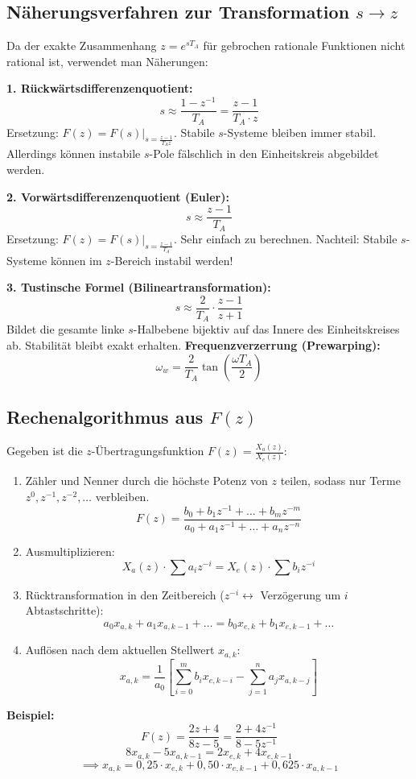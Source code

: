 \subsection{Näherungsverfahren zur Transformation $s \to z$}
\begin{tcolorbox}
Da der exakte Zusammenhang $z = e^{s T_A}$ für gebrochen rationale Funktionen nicht rational ist, verwendet man Näherungen:

\textbf{1. Rückwärtsdifferenzenquotient:}
\[
s \approx \frac{1 - z^{-1}}{T_A} = \frac{z - 1}{T_A \cdot z}
\]
Ersetzung: $F(z) = F(s)\big|_{s = \frac{z-1}{T_A z}}$.
Stabile $s$-Systeme bleiben immer stabil. Allerdings können instabile $s$-Pole fälschlich in den Einheitskreis abgebildet werden.

\textbf{2. Vorwärtsdifferenzenquotient (Euler):}
\[
s \approx \frac{z - 1}{T_A}
\]
Ersetzung: $F(z) = F(s)\big|_{s = \frac{z-1}{T_A}}$.
Sehr einfach zu berechnen. Nachteil: Stabile $s$-Systeme können im $z$-Bereich instabil werden!

\textbf{3. Tustinsche Formel (Bilineartransformation):}
\[
s \approx \frac{2}{T_A} \cdot \frac{z - 1}{z + 1}
\]
Bildet die gesamte linke $s$-Halbebene bijektiv auf das Innere des Einheitskreises ab. Stabilität bleibt exakt erhalten.
\textbf{Frequenzverzerrung (Prewarping):}
\[
\omega_w = \frac{2}{T_A} \tan\left( \frac{\omega T_A}{2} \right)
\]
\end{tcolorbox}

\subsection{Rechenalgorithmus aus $F(z)$}
\begin{tcolorbox}
Gegeben ist die $z$-Übertragungsfunktion $F(z) = \frac{X_a(z)}{X_e(z)}$:
\begin{enumerate}
  \item Zähler und Nenner durch die höchste Potenz von $z$ teilen, sodass nur Terme $z^0, z^{-1}, z^{-2}, \dots$ verbleiben.
  \[
  F(z) = \frac{b_0 + b_1 z^{-1} + \dots + b_m z^{-m}}{a_0 + a_1 z^{-1} + \dots + a_n z^{-n}}
  \]
  \item Ausmultiplizieren:
  \[
  X_a(z) \cdot \sum a_i z^{-i} = X_e(z) \cdot \sum b_i z^{-i}
  \]
  \item Rücktransformation in den Zeitbereich ($z^{-i} \leftrightarrow$ Verzögerung um $i$ Abtastschritte):
  \[
  a_0 x_{a,k} + a_1 x_{a,k-1} + \dots = b_0 x_{e,k} + b_1 x_{e,k-1} + \dots
  \]
  \item Auflösen nach dem aktuellen Stellwert $x_{a,k}$:
  \[
  x_{a,k} = \frac{1}{a_0} \left[ \sum_{i=0}^m b_i x_{e,k-i} - \sum_{j=1}^n a_j x_{a,k-j} \right]
  \]
\end{enumerate}
\textbf{Beispiel:}
\[
F(z) = \frac{2z + 4}{8z - 5} = \frac{2 + 4 z^{-1}}{8 - 5 z^{-1}}
\]
\[
8 x_{a,k} - 5 x_{a,k-1} = 2 x_{e,k} + 4 x_{e,k-1}
\]
\[
\implies x_{a,k} = 0{,}25 \cdot x_{e,k} + 0{,}50 \cdot x_{e,k-1} + 0{,}625 \cdot x_{a,k-1}
\]
\end{tcolorbox}

